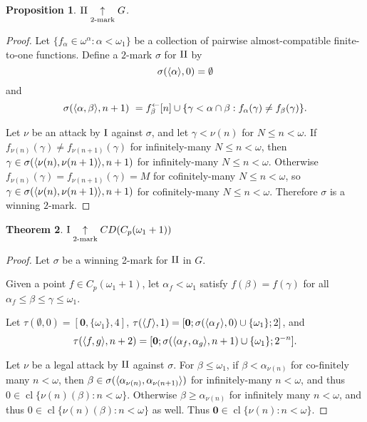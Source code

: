 \documentclass[11pt]{article}
\theoremstyle{plain}
\newtheorem{theorem}{Theorem}
\newtheorem{proposition}[theorem]{Proposition}
\theoremstyle{definition}
\theoremstyle{remark}
\theoremstyle{plain}
\theoremstyle{definition}
\theoremstyle{remark}
\begin{document}
\begin{proposition}
  \(\mathrm{II} \underset{2\text{-mark}}{\uparrow} G\).
\end{proposition}
\begin{proof}
  Let \(\{f_\alpha\in\omega^\alpha:\alpha<\omega_1\}\) be a collection
  of pairwise almost-compatible finite-to-one functions.
  Define a \(2\)-mark \(\sigma\) for \(\mathrm{II}\) by
  \[\sigma(\langle\alpha\rangle,0)=\emptyset\] and
  \[
    \sigma(\langle\alpha,\beta\rangle,n+1)\
      =
    f_\beta^\leftarrow[n]
      \cup
    \{\gamma<\alpha\cap\beta:f_\alpha(\gamma)\not=f_\beta(\gamma)\}
  .\]
  
  Let \(\nu\) be an attack by \(\mathrm{I}\) against \(\sigma\), and let
  \(\gamma<\nu(n)\) for \(N\leq n<\omega\).
  If \(f_{\nu(n)}(\gamma)\not=f_{\nu(n+1)}(\gamma)\) for infinitely-many
  \(N\leq n<\omega\), then \(\gamma\in\sigma(\langle\nu(n),\nu(n+1)\rangle,n+1)\)
  for infinitely-many \(N\leq n<\omega\).
  Otherwise \(f_{\nu(n)}(\gamma)=f_{\nu(n+1)}(\gamma)=M\) for cofinitely-many
  \(N\leq n<\omega\), so \(\gamma\in\sigma(\langle\nu(n),\nu(n+1)\rangle,n+1)\)
  for cofinitely-many \(N\leq n<\omega\). Therefore \(\sigma\) is a winning \(2\)-mark.
\end{proof}

\begin{theorem}
  \(\mathrm{I}\underset{2\text{-mark}}{\uparrow}CD(C_p(\omega_1+1))\)
\end{theorem}
\begin{proof}
  Let \(\sigma\) be a winning 2-mark for \(\mathrm{II}\) in \(G\).

  Given a point \(f\in C_p(\omega_1+1)\),
  let \(\alpha_f<\omega_1\) satisfy \(f(\beta)=f(\gamma)\) for all
  \(\alpha_f\leq\beta\leq\gamma\leq\omega_1\).

  Let \(\tau(\emptyset,0)=[\mathbf{0},\{\omega_1\},4]\),
  \(\tau(\langle f\rangle,1)=[\mathbf{0};\sigma(\langle\alpha_f\rangle,0)\cup\{\omega_1\};2]\), and
  \[\tau(\langle f,g\rangle,n+2)=[\mathbf{0};\sigma(\langle\alpha_f,\alpha_g\rangle,n+1)\cup\{\omega_1\};2^{-n}].\]

  Let \(\nu\) be a legal attack by \(\mathrm{II}\) against \(\sigma\).
  For \(\beta\leq\omega_1\), if \(\beta<\alpha_{\nu(n)}\)
  for co-finitely many \(n<\omega\), then
  \(\beta\in\sigma(\langle\alpha_{\nu(n)},\alpha_{\nu(n+1)}\rangle)\) for
  infinitely-many \(n<\omega\), and thus \(0\in\operatorname{cl}\{\nu(n)(\beta):n<\omega\}\).
  Otherwise \(\beta\geq\alpha_{\nu(n)}\) for infinitely many \(n<\omega\),
  and thus \(0\in\operatorname{cl}\{\nu(n)(\beta):n<\omega\}\) as well.
  Thus \(\mathbf{0}\in\operatorname{cl}\{\nu(n):n<\omega\}\).
\end{proof}
\end{document}
